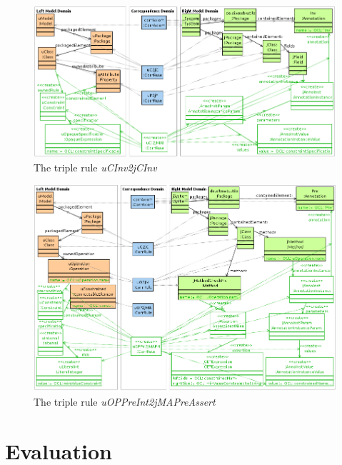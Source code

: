 \documentclass[tuberlin,cic,tc,english,noabntcite]{iiufrgs}
\begin{document}
\begin{figure}[H]
    \caption{The triple rule \emph{uCInv2jCInv}}
    \begin{center}
        \includegraphics[width=.9\textwidth]{uCInv2jCInv}
    \end{center}
    \label{fig:uCInv2jCInv}
\end{figure}
\begin{figure}[H]
    \caption{The triple rule \emph{uOPPreInt2jMAPreAssert}}
    \begin{center}
        \includegraphics[width=.9\textwidth]{uOPPreInt2jMAPreAssert}
    \end{center}
    \label{fig:uOPPreInt2jMAPreAssert}
\end{figure}

\section{Evaluation}
\label{subsec:Evaluation}
\end{document}
